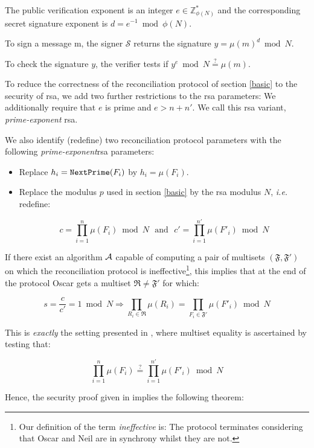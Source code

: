 \documentclass[11pt]{llncs}
\begin{document}
The public verification exponent is an integer $e \in {\mathbb Z}^{*}_{\phi(N)}$ and the corresponding secret signature exponent is $d=e^{-1} \bmod \phi(N)$.\smallskip

To sign a message m, the signer $\mathcal{S}$ returns the signature $y=\mu(m)^d \bmod{N}$.\smallskip

To check the signature $y$, the verifier tests if $y^e \bmod{N}\stackrel{?}{=}\mu(m)$.\smallskip

To reduce the correctness of the reconciliation protocol of section \ref{basic} to the security of {\sc rsa}, we add two further restrictions to the {\sc rsa} parameters: We additionally require that $e$ is prime and $e>n+n'$. We call this {\sc rsa} variant, {\sl prime-exponent} {\sc rsa}.\smallskip

We also identify (redefine) two reconciliation protocol parameters with the following {\sl prime-exponent}{\sc rsa} parameters:

\begin{itemize}
\item Replace $h_i=\mbox{{\tt NextPrime}}(F_i)$ by $h_i=\mu(F_i)$.\smallskip

\item Replace the modulus $p$ used in section \ref{basic} by the {\sc rsa} modulus $N$, {\sl i.e.} redefine:

$$c=\prod_{i=1}^{n}\mu(F_i)\bmod{N}\mbox{~~and~~}c'=\prod_{i=1}^{n'}\mu(F'_i)\bmod{N}$$
\end{itemize}

If there exist an algorithm $\cal A$ capable of computing a pair of multisets $(\mathfrak{F},\mathfrak{F}')$ on which the reconciliation protocol is ineffective\footnote{Our definition of the term {\sl ineffective} is: The protocol terminates considering that Oscar and Neil are in synchrony whilst they are not.}, this implies that at the end of the protocol Oscar gets a multiset $\mathfrak{R}\neq\mathfrak{F'}$ for which:

$$s=\frac{c}{c'}=1 \bmod N \Rightarrow \prod_{R_i\in \mathfrak{R}}\mu(R_i)=\prod_{F_i\in \mathfrak{F}'}\mu(F'_i)\bmod{N}$$

This is {\sl exactly} the setting presented in \cite{comparing}, where multiset equality is ascertained by testing that:

$$\prod_{i=1}^{n}\mu(F_i)\stackrel{?}{=}\prod_{i=1}^{n'}\mu(F'_i)\bmod{N}$$

Hence, the security proof given in \cite{comparing} implies the following theorem:
\end{document}
